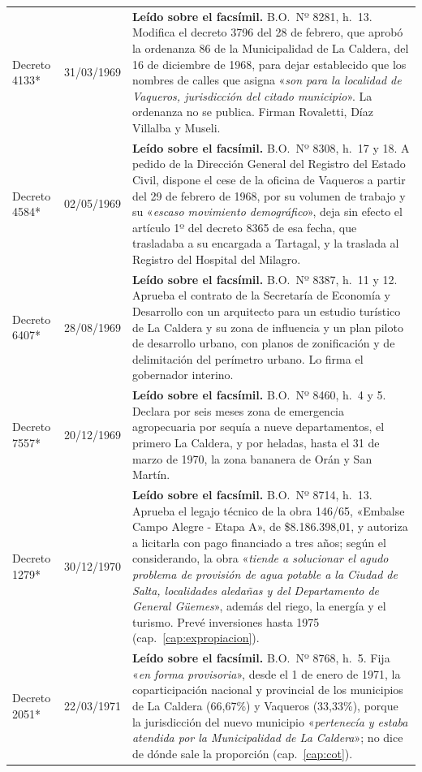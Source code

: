 \begin{longtable}{@{}p{3.2cm}p{1.9cm}p{7.9cm}@{}}
Decreto 4133* & 31/03/1969 & \textbf{Leído sobre el facsímil.} B.O.\ Nº 8281, h.\ 13. Modifica el decreto 3796 del 28 de febrero, que aprobó la ordenanza 86 de la Municipalidad de La Caldera, del 16 de diciembre de 1968, para dejar establecido que los nombres de calles que asigna «\textit{son para la localidad de Vaqueros, jurisdicción del citado municipio}». La ordenanza no se publica. Firman Rovaletti, Díaz Villalba y Museli. \\
Decreto 4584* & 02/05/1969 & \textbf{Leído sobre el facsímil.} B.O.\ Nº 8308, h.\ 17 y 18. A pedido de la Dirección General del Registro del Estado Civil, dispone el cese de la oficina de Vaqueros a partir del 29 de febrero de 1968, por su volumen de trabajo y su «\textit{escaso movimiento demográfico}», deja sin efecto el artículo 1º del decreto 8365 de esa fecha, que trasladaba a su encargada a Tartagal, y la traslada al Registro del Hospital del Milagro. \\
Decreto 6407* & 28/08/1969 & \textbf{Leído sobre el facsímil.} B.O.\ Nº 8387, h.\ 11 y 12. Aprueba el contrato de la Secretaría de Economía y Desarrollo con un arquitecto para un estudio turístico de La Caldera y su zona de influencia y un plan piloto de desarrollo urbano, con planos de zonificación y de delimitación del perímetro urbano. Lo firma el gobernador interino. \\
Decreto 7557* & 20/12/1969 & \textbf{Leído sobre el facsímil.} B.O.\ Nº 8460, h.\ 4 y 5. Declara por seis meses zona de emergencia agropecuaria por sequía a nueve departamentos, el primero La Caldera, y por heladas, hasta el 31 de marzo de 1970, la zona bananera de Orán y San Martín. \\
Decreto 1279* & 30/12/1970 & \textbf{Leído sobre el facsímil.} B.O.\ Nº 8714, h.\ 13. Aprueba el legajo técnico de la obra 146/65, «Embalse Campo Alegre - Etapa A», de \$8.186.398,01, y autoriza a licitarla con pago financiado a tres años; según el considerando, la obra «\textit{tiende a solucionar el agudo problema de provisión de agua potable a la Ciudad de Salta, localidades aledañas y del Departamento de General Güemes}», además del riego, la energía y el turismo. Prevé inversiones hasta 1975 (cap.\ \ref{cap:expropiacion}). \\
Decreto 2051* & 22/03/1971 & \textbf{Leído sobre el facsímil.} B.O.\ Nº 8768, h.\ 5. Fija «\textit{en forma provisoria}», desde el 1 de enero de 1971, la coparticipación nacional y provincial de los municipios de La Caldera (66,67\%) y Vaqueros (33,33\%), porque la jurisdicción del nuevo municipio «\textit{pertenecía y estaba atendida por la Municipalidad de La Caldera}»; no dice de dónde sale la proporción (cap.\ \ref{cap:cot}). \\

\end{longtable}

